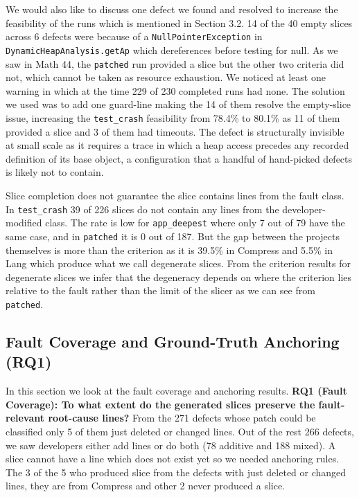 \documentclass[sigconf,nonacm]{acmart}
\begin{document}
We would also like to discuss one defect we found and resolved to increase the feasibility of the runs which is mentioned in Section 3.2. 14 of the 40 empty slices across 6 defects were because of a \texttt{NullPointerException} in \texttt{DynamicHeapAnalysis.getAp} which dereferences before testing for null. As we saw in Math 44, the \texttt{patched} run provided a slice but the other two criteria did not, which cannot be taken as resource exhaustion. We noticed at least one warning in which at the time 229 of 230 completed runs had none. The solution we used was to add one guard-line making the 14 of them resolve the empty-slice issue, increasing the \texttt{test\_crash} feasibility from 78.4\% to 80.1\% as 11 of them provided a slice and 3 of them had timeouts. The defect is structurally invisible at small scale as it requires a trace in which a heap access precedes any recorded definition of its base object, a configuration that a handful of hand-picked defects is likely not to contain.

Slice completion does not guarantee the slice contains lines from the fault class. In \texttt{test\_crash} 39 of 226 slices do not contain any lines from the developer-modified class. \newline The rate is low for \texttt{app\_deepest} where only 7 out of 79 have the same case, and in \texttt{patched} it is 0 out of 187. But the gap between the projects themselves is more than the criterion as it is 39.5\% in Compress and 5.5\% in Lang which produce what we call degenerate slices. From the criterion results for degenerate slices we infer that the degeneracy depends on where the criterion lies relative to the fault rather than the limit of the slicer as we can see from \texttt{patched}.

\subsection{Fault Coverage and Ground-Truth Anchoring (RQ1)}
In this section we look at the fault coverage and anchoring results. \textbf{RQ1 (Fault Coverage): To what extent do the generated slices preserve the fault-relevant root-cause lines?} From the 271 defects whose patch could be classified only 5 of them just deleted or changed lines. Out of the rest 266 defects, we saw developers either add lines or do both (78 additive and 188 mixed). A slice cannot have a line which does not exist yet so we needed anchoring rules. The 3 of the 5 who produced slice from the defects with just deleted or changed lines, they are from Compress and other 2 never produced a slice.  
\end{document}
